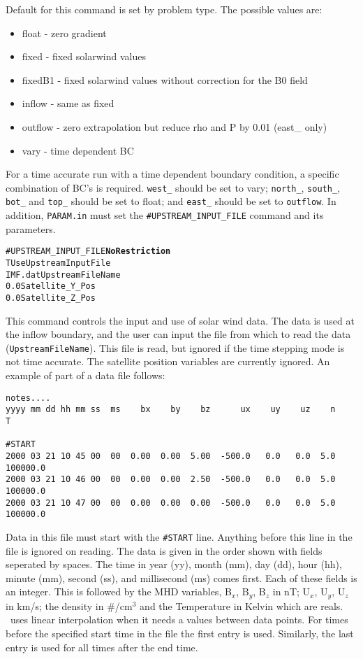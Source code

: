 Default for this command is set by problem type. The possible values are:

\begin{itemize}
\setlength{\itemsep}{0.0 in}
\item float - zero gradient
\item fixed - fixed solarwind values
\item fixedB1 - fixed solarwind values without correction for the B0 field
\item inflow - same as fixed
\item outflow - zero extrapolation but reduce rho and P by 0.01 (east\_ only)
\item vary - time dependent BC
\end{itemize}

For a time accurate run with a time dependent boundary condition,
a specific combination of BC's is required.  {\tt west\_}
should be set to vary; {\tt north\_}, {\tt south\_}, {\tt bot\_} and {\tt top\_}
should be set to float; and {\tt east\_} should be set to {\tt outflow}. 
In addition, {\tt PARAM.in} must set the {\tt \#UPSTREAM\_INPUT\_FILE} 
command and its parameters.
\ \ \\


\begin{alltt}
#UPSTREAM_INPUT_FILE  \hfill {\bf No Restriction}
T                      UseUpstreamInputFile
IMF.dat                UpstreamFileName
0.0                    Satellite_Y_Pos
0.0                    Satellite_Z_Pos
\end{alltt}

This command controls the input and use of solar wind data.  The data is
used at the inflow boundary, and the  user can input the file from which
to read the data ({\tt UpstreamFileName}).  This file is read, but 
ignored if the time stepping mode is not time accurate.
The satellite position variables are currently ignored.  An example of part
of a data file follows:
\begin{verbatim}
notes....
yyyy mm dd hh mm ss  ms    bx    by    bz      ux    uy    uz    n         T

#START
2000 03 21 10 45 00  00  0.00  0.00  5.00  -500.0   0.0   0.0  5.0  100000.0
2000 03 21 10 46 00  00  0.00  0.00  2.50  -500.0   0.0   0.0  5.0  100000.0
2000 03 21 10 47 00  00  0.00  0.00  0.00  -500.0   0.0   0.0  5.0  100000.0
\end{verbatim}
Data in this file must start with the {\tt \#START} line.  Anything before
this line in the file is ignored on reading.  The data is given in the order shown with
fields seperated by spaces.  The time in 
year (yy), month (mm), day (dd), hour (hh), minute (mm), second (ss), 
and millisecond (ms) comes first.  Each of these fields is an integer.
This is followed by the MHD variables, B$_x$, B$_y$, B$_z$ in nT; U$_x$, U$_y$, U$_z$
in km/s; the density in \#/cm$^3$ and the Temperature in Kelvin which are reals.  
\BATSRUS\ uses linear interpolation when it needs a values between data points.
For times before the specified start time in the file the first entry is used.
Similarly, the last entry is used for all times after the end time.
\ \ \\


